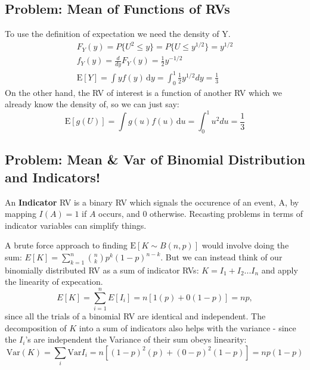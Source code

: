 \subsection{Problem: Mean of Functions of RVs}
To use the definition of expectation we need the density of Y. 
\begin{align}
F_Y(y) = P\{U^2 \leq y\} = P\{U \leq y^{1/2}\} = y^{1/2}\\
f_Y(y) = \frac{d}{dy}F_Y(y) = \frac{1}{2}y^{-1/2}\\
\mathrm {E} [Y]=\int y f(y)\,\mathrm {d} y = \int _{0}^{1}\frac{1}{2}y^{1/2}dy = \frac{1}{3}
\end{align}
On the other hand, the RV of interest is a function of another RV which we already know the density of, so we can just say:
\begin{equation}
\mathrm {E} [g(U)]=\int g(u)f(u)\,\mathrm {d} u = \int _{0}^{1}u^2du = \frac{1}{3}
\end{equation}



\subsection{Problem: Mean \& Var of Binomial Distribution and Indicators!}
An \textbf{Indicator} RV is a binary RV which signals the occurence of an event, A, by mapping $I(A) = 1$ if $A$ occurs, and 0 otherwise. Recasting problems in terms of indicator variables can simplify things. 
\nn

A brute force approach to finding $\mathrm{E}[K\sim B(n,p)]$ would involve doing the sum: $E[K] = \sum_{k=1}^{n}{n\choose k}  p^k(1-p)^{n-k}.$ But we can instead think of our binomially distributed RV as a sum of indicator RVs: $K = I_1 + I_2... I_n$ and apply the linearity of expecation. 
\begin{equation}
E[K] = \sum_{i=1}^{n}E[I_i] = n[1(p)+0(1-p)] = np,
\end{equation}
since all the trials of a binomial RV are identical and independent. The decomposition of $K$ into a sum of indicators also helps with the variance - since the $I_i$'s are independent the Variance of their sum obeys linearity:
\begin{equation}
\mathrm{Var}(K) = \sum_i \mathrm{Var}I_i = n[(1-p)^2(p)+(0-p)^2(1-p)] = np(1-p)
\end{equation}



